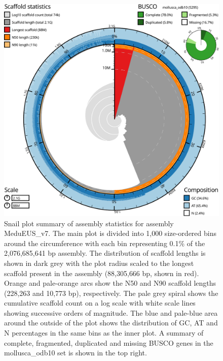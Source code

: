 \documentclass[11pt, a4paper]{article}
\begin{document}
\begin{figure}
	\includegraphics[width=\linewidth]{figures/btk_snail_MeduEUS_v7}
	\caption{Snail plot summary of assembly statistics for assembly MeduEUS\_v7. The main plot is divided into 1,000 size-ordered bins around the circumference with each bin representing 0.1\% of the 2,076,685,641 bp assembly. The distribution of scaffold lengths is shown in dark grey with the plot radius scaled to the longest scaffold present in the assembly (88,305,666 bp, shown in red). Orange and pale-orange arcs show the N50 and N90 scaffold lengths (228,263 and 10,773 bp), respectively. The pale grey spiral shows the cumulative scaffold count on a log scale with white scale lines showing successive orders of magnitude. The blue and pale-blue area around the outside of the plot shows the distribution of GC, AT and N percentages in the same bins as the inner plot. A summary of complete, fragmented, duplicated and missing BUSCO genes in the mollusca\_odb10 set is shown in the top right. }
	\label{supfig:btk-snail-MeduEUS}
\end{figure}
\end{document}
